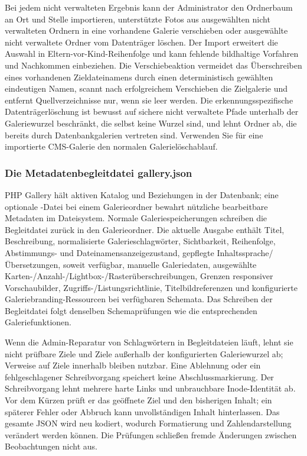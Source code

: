 \documentclass[11pt,a4paper]{article}
\newcommand{\filepath}[1]{\path{#1}}
\begin{document}
Bei jedem nicht verwalteten Ergebnis kann der Administrator den Ordnerbaum an
Ort und Stelle importieren, unterstützte Fotos aus ausgewählten nicht
verwalteten Ordnern in eine vorhandene Galerie verschieben oder ausgewählte
nicht verwaltete Ordner vom Datenträger löschen. Der Import erweitert die
Auswahl in Eltern-vor-Kind-Reihenfolge und kann fehlende bildhaltige Vorfahren
und Nachkommen einbeziehen. Die Verschiebeaktion vermeidet das Überschreiben
eines vorhandenen Zieldateinamens durch einen deterministisch gewählten
eindeutigen Namen, scannt nach erfolgreichem Verschieben die Zielgalerie und
entfernt Quellverzeichnisse nur, wenn sie leer werden. Die erkennungsspezifische
Datenträgerlöschung ist bewusst auf sichere nicht verwaltete Pfade unterhalb der
Galeriewurzel beschränkt, die selbst keine Wurzel sind, und lehnt Ordner ab, die
bereits durch Datenbankgalerien vertreten sind. Verwenden Sie für eine
importierte CMS-Galerie den normalen Galerielöschablauf.

\subsubsection{Die Metadatenbegleitdatei gallery.json}

PHP Gallery hält aktiven Katalog und Beziehungen in der Datenbank; eine
optionale \filepath{gallery.json}-Datei bei einem Galerieordner bewahrt
nützliche bearbeitbare Metadaten im Dateisystem. Normale Galeriespeicherungen
schreiben die Begleitdatei zurück in den Galerieordner. Die aktuelle Ausgabe
enthält Titel, Beschreibung, normalisierte Galerieschlagwörter, Sichtbarkeit,
Reihenfolge, Abstimmungs- und Dateinamensanzeigezustand, gepflegte
Inhaltssprache/Übersetzungen, soweit verfügbar, manuelle Galeriedaten,
ausgewählte Karten-/Anzahl-/Lightbox-/Rasterüberschreibungen, Grenzen
responsiver Vorschaubilder, Zugriffs-/Listungsrichtlinie, Titelbildreferenzen
und konfigurierte Galeriebranding-Ressourcen bei verfügbaren Schemata. Das
Schreiben der Begleitdatei folgt denselben Schemaprüfungen wie die
entsprechenden Galeriefunktionen.

Wenn die Admin-Reparatur von Schlagwörtern in Begleitdateien läuft, lehnt sie
nicht prüfbare Ziele und Ziele außerhalb der konfigurierten Galeriewurzel ab;
Verweise auf Ziele innerhalb bleiben nutzbar. Eine Ablehnung oder ein
fehlgeschlagener Schreibvorgang speichert keine Abschlussmarkierung. Der
Schreibvorgang lehnt mehrere harte Links und unbrauchbare Inode-Identität ab.
Vor dem Kürzen prüft er das geöffnete Ziel und den bisherigen Inhalt;
ein späterer Fehler oder Abbruch kann unvollständigen Inhalt hinterlassen. Das
gesamte JSON wird neu kodiert, wodurch Formatierung und Zahlendarstellung
verändert werden können. Die Prüfungen schließen fremde Änderungen zwischen
Beobachtungen nicht aus.
\end{document}
